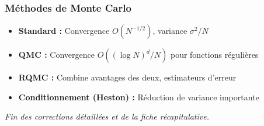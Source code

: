 \documentclass[12pt,a4paper]{article}
\theoremstyle{definition}
\theoremstyle{remark}
\begin{document}
\subsubsection{Méthodes de Monte Carlo}

\begin{itemize}
\item \textbf{Standard :} Convergence $O(N^{-1/2})$, variance $\sigma^2/N$
\item \textbf{QMC :} Convergence $O((\log N)^d/N)$ pour fonctions régulières
\item \textbf{RQMC :} Combine avantages des deux, estimateurs d'erreur
\item \textbf{Conditionnement (Heston) :} Réduction de variance importante
\end{itemize}

\textit{Fin des corrections détaillées et de la fiche récapitulative.}
\end{document}
